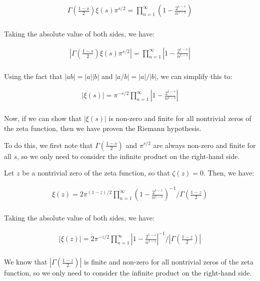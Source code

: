 \documentclass{article}
\begin{document}
\begin{align*}
\Gamma\left(\frac{1-s}{2}\right)\xi(s)\pi^{s/2} = \prod_{n=1}^{\infty} \left(1 - \frac{2^{1-s}}{n^{1-s}}\right) \\
\end{align*}

Taking the absolute value of both sides, we have:

\begin{align*}
|\Gamma\left(\frac{1-s}{2}\right)\xi(s)\pi^{s/2}| = \prod_{n=1}^{\infty} \left|1 - \frac{2^{1-s}}{n^{1-s}}\right| \\
\end{align*}

Using the fact that $|ab| = |a||b|$ and $|a/b| = |a|/|b|$, we can simplify this to:

\begin{align*}
|\xi(s)| = \pi^{-s/2} \prod_{n=1}^{\infty} \left|1 - \frac{2^{1-s}}{n^{1-s}}\right| \\
\end{align*}

Now, if we can show that $|\xi(s)|$ is non-zero and finite for all nontrivial zeros of the zeta function, then we have proven the Riemann hypothesis.

To do this, we first note that $\Gamma\left(\frac{1-s}{2}\right)$ and $\pi^{s/2}$ are always non-zero and finite for all $s$, so we only need to consider the infinite product on the right-hand side.

Let $z$ be a nontrivial zero of the zeta function, so that $\zeta(z) = 0$. Then, we have:

\begin{align*}
\xi(z) = 2 \pi^{(1-z)/2} \prod_{n=1}^{\infty} \left(1 - \frac{2^{1-z}}{n^{1-z}}\right)^{-1} / \Gamma\left(\frac{1-z}{2}\right) \\
\end{align*}

Taking the absolute value of both sides, we have:

\begin{align*}
|\xi(z)| = 2 \pi^{-z/2} \prod_{n=1}^{\infty} \left|1 - \frac{2^{1-z}}{n^{1-z}}\right|^{-1} / |\Gamma\left(\frac{1-z}{2}\right)| \\
\end{align*}

We know that $|\Gamma\left(\frac{1-z}{2}\right)|$ is finite and non-zero for all nontrivial zeros of the zeta function, so we only need to consider the infinite product on the right-hand side.
\end{document}
